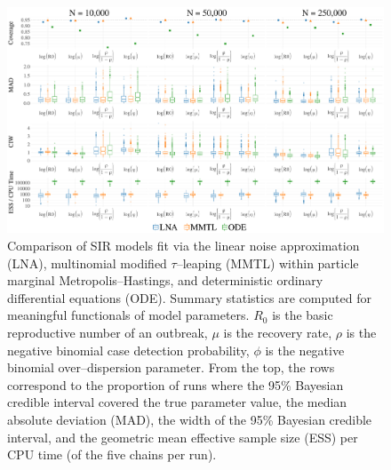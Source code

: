 \begin{figure}[!ht]
	\centering
	\includegraphics[width=\textwidth]{figures/lna_coverage_plots_main}
	\caption{Comparison of SIR models fit via the linear noise approximation (LNA), multinomial modified $ \tau $--leaping (MMTL) within particle marginal Metropolis--Hastings, and deterministic ordinary differential equations (ODE). Summary statistics are computed for meaningful functionals of model parameters. $ R_0 $ is the basic reproductive number of an outbreak, $ \mu $ is the recovery rate, $ \rho $ is the negative binomial case detection probability, $ \phi $ is the negative binomial over--dispersion parameter. From the top, the rows correspond to the proportion of runs where the 95\% Bayesian credible interval covered the true parameter value, the median absolute deviation (MAD), the width of the 95\% Bayesian credible interval, and the geometric mean effective sample size (ESS) per CPU time (of the five chains per run).}
	\label{fig:lna_coverage_main}
\end{figure}